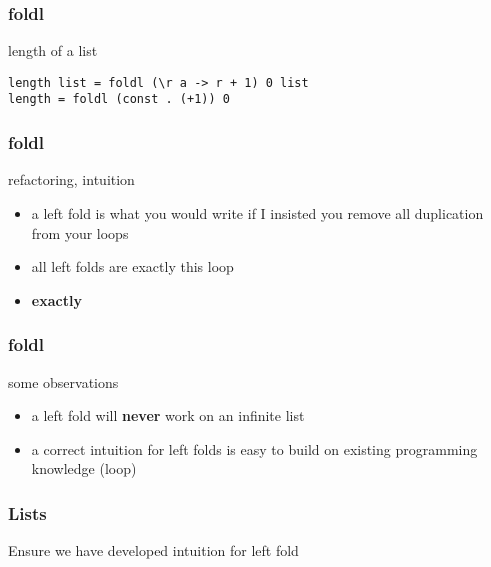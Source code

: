 \begin{frame}[fragile]
\frametitle{foldl}
\begin{block}{length of a list}
\begin{lstlisting}[style=haskell,basicstyle=\scriptsize\ttfamily,mathescape]
length list = foldl (\r a -> r + 1) 0 list
length = foldl (const . (+1)) 0
\end{lstlisting}
\end{block}
\end{frame}

\begin{frame}
\frametitle{foldl}
\begin{block}{refactoring, intuition}
\begin{itemize}
\item<1-> a left fold is what you would write if I insisted you remove all duplication from your loops
\item<2-> all left folds are exactly this loop
\item<3-> \textbf{exactly}
\end{itemize}
\end{block}
\end{frame}

\begin{frame}
\frametitle{foldl}
\begin{block}{some observations}
\begin{itemize}
\item<1-> a left fold will \textbf{never} work on an infinite list
\item<2-> a correct intuition for left folds is easy to build on existing programming knowledge (loop)
\end{itemize}
\end{block}
\end{frame}

\begin{frame}
\frametitle{Lists}
\begin{center}
Ensure we have developed intuition for left fold
\end{center}
\end{frame}
